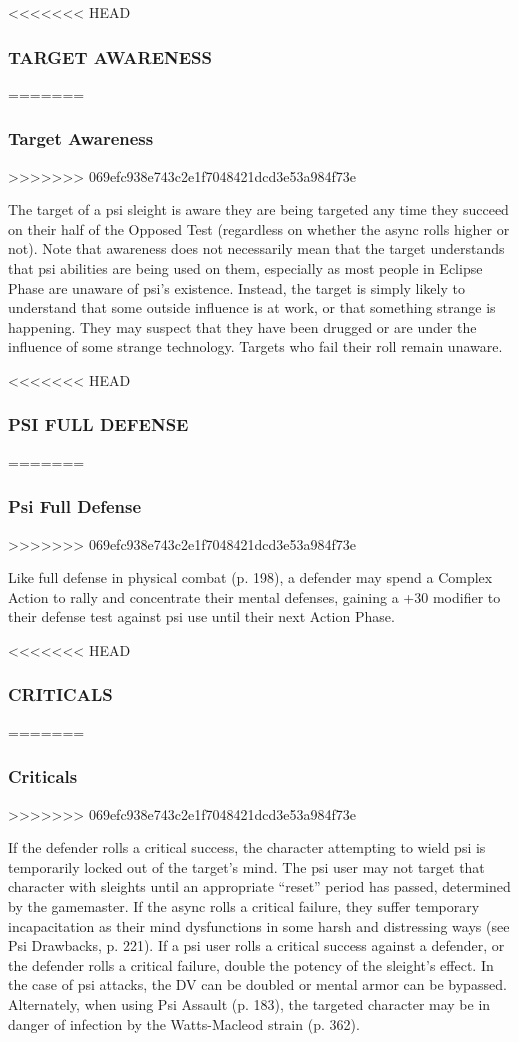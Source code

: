 <<<<<<< HEAD \subsubsection{TARGET AWARENESS} ======= \subsubsection{Target Awareness} >>>>>>> 069efc938e743c2e1f7048421dcd3e53a984f73e 

The target of a psi sleight is aware they are being targeted any time they succeed on their half of the Opposed Test (regardless on whether the async rolls higher or not). Note that awareness does not necessarily mean that the target understands that psi abilities are being used on them, especially as most people in Eclipse Phase are unaware of psi’s existence. Instead, the target is simply likely to understand that some outside influence is at work, or that something strange is happening. They may suspect that they have been drugged or are under the influence of some strange technology. Targets who fail their roll remain unaware. 

<<<<<<< HEAD \subsubsection{PSI FULL DEFENSE} ======= \subsubsection{Psi Full Defense} >>>>>>> 069efc938e743c2e1f7048421dcd3e53a984f73e 

Like full defense in physical combat (p. 198), a defender may spend a Complex Action to rally and concentrate their mental defenses, gaining a +30 modifier to their defense test against psi use until their next Action Phase. 

<<<<<<< HEAD \subsubsection{CRITICALS} ======= \subsubsection{Criticals} >>>>>>> 069efc938e743c2e1f7048421dcd3e53a984f73e 

If the defender rolls a critical success, the character attempting to wield psi is temporarily locked out of the target’s mind. The psi user may not target that character with sleights until an appropriate “reset” period has passed, determined by the gamemaster. If the async rolls a critical failure, they suffer temporary incapacitation as their mind dysfunctions in some harsh and distressing ways (see Psi Drawbacks, p. 221). If a psi user rolls a critical success against a defender, or the defender rolls a critical failure, double the potency of the sleight’s effect. In the case of psi attacks, the DV can be doubled or mental armor can be bypassed. Alternately, when using Psi Assault (p. 183), the targeted character may be in danger of infection by the Watts-Macleod strain (p. 362). 


